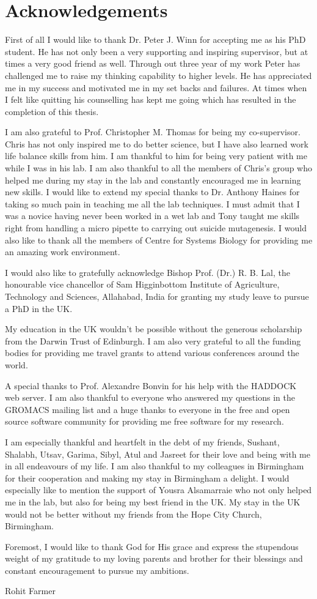\chapter*{Acknowledgements}

First of all I would like to thank Dr. Peter J. Winn for accepting me as his PhD student. He has not only been a very supporting and inspiring supervisor, but at times a very good friend as well. Through out three year of my work Peter has challenged me to raise my thinking capability to higher levels. He has appreciated me in my success and motivated me in my set backs and failures. At times when I felt like quitting his counselling has kept me going which has resulted in the completion of this thesis. 

I am also grateful to Prof. Christopher M. Thomas for being my co-supervisor. Chris has not only inspired me to do better science, but I have also learned work life balance skills from him. I am thankful to him for being very patient with me while I was in his lab. I am also thankful to all the members of Chris's group who helped me during my stay in the lab and constantly encouraged me in learning new skills. I would like to extend my special thanks to Dr. Anthony Haines for taking so much pain in teaching me all the lab techniques. I must admit that I was a novice having never been worked in a wet lab and Tony taught me skills right from handling a micro pipette to carrying out suicide mutagenesis. I would also like to thank all the members of Centre for Systems Biology for providing me an amazing work environment. 

I would also like to gratefully acknowledge Bishop Prof. (Dr.) R. B. Lal, the honourable vice chancellor of Sam Higginbottom Institute of Agriculture, Technology and Sciences, Allahabad, India for granting my study leave to pursue a PhD in the UK. 

My education in the UK wouldn't be possible without the generous scholarship from the Darwin Trust of Edinburgh. I am also very grateful to all the funding bodies for providing me travel grants to attend various conferences around the world. 

A special thanks to Prof. Alexandre Bonvin for his help with the HADDOCK web server. I am also thankful to everyone who answered my questions in the GROMACS mailing list and a huge thanks to everyone in the free and open source software community for providing me free software for my research. 

I am especially thankful and heartfelt in the debt of my friends, Sushant, Shalabh, Utsav, Garima, Sibyl, Atul and Jasreet for their love and being with me in all endeavours of my life. I am also thankful to my colleagues in Birmingham for their cooperation and making my stay in Birmingham a delight. I would especially like to mention the support of Yousra Alsamarraie who not only helped me in the lab, but also for being my best friend in the UK. My stay in the UK would not be better without my friends from the Hope City Church, Birmingham. 

Foremost, I would like to thank God for His grace and express the stupendous weight of my gratitude to my loving parents and brother for their blessings and constant encouragement to pursue my ambitions.

\begin{flushright}
Rohit Farmer
\end{flushright}